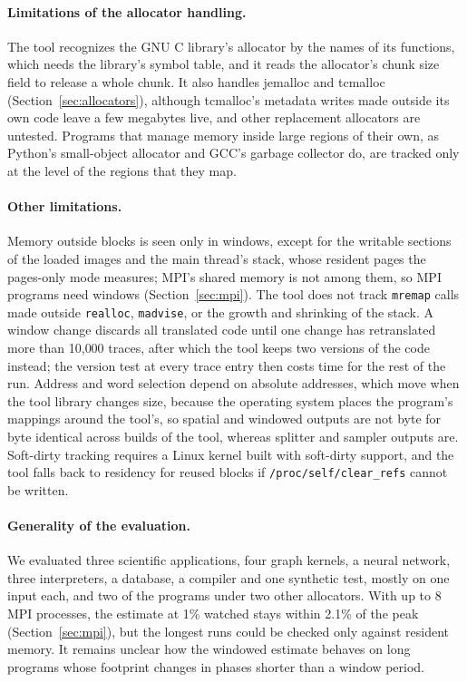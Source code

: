 \documentclass[11pt]{article}
\newcommand{\secref}[1]{Section~\ref{#1}}
\begin{document}
\paragraph{Limitations of the allocator handling.}
The tool recognizes the GNU C library's allocator by the names of its functions, which needs the library's symbol table, and it reads the allocator's chunk size field to release a whole chunk. It also handles jemalloc and tcmalloc (\secref{sec:allocators}), although tcmalloc's metadata writes made outside its own code leave a few megabytes live, and other replacement allocators are untested. Programs that manage memory inside large regions of their own, as Python's small-object allocator and GCC's garbage collector do, are tracked only at the level of the regions that they map.

\paragraph{Other limitations.}
Memory outside blocks is seen only in windows, except for the writable sections of the loaded images and the main thread's stack, whose resident pages the pages-only mode measures; MPI's shared memory is not among them, so MPI programs need windows (\secref{sec:mpi}). The tool does not track \texttt{mremap} calls made outside \texttt{realloc}, \texttt{madvise}, or the growth and shrinking of the stack. A window change discards all translated code until one change has retranslated more than 10{,}000 traces, after which the tool keeps two versions of the code instead; the version test at every trace entry then costs time for the rest of the run. Address and word selection depend on absolute addresses, which move when the tool library changes size, because the operating system places the program's mappings around the tool's, so spatial and windowed outputs are not byte for byte identical across builds of the tool, whereas splitter and sampler outputs are. Soft-dirty tracking requires a Linux kernel built with soft-dirty support, and the tool falls back to residency for reused blocks if \texttt{/proc/self/clear\_refs} cannot be written.

\paragraph{Generality of the evaluation.}
We evaluated three scientific applications, four graph kernels, a neural network, three interpreters, a database, a compiler and one synthetic test, mostly on one input each, and two of the programs under two other allocators. With up to 8 MPI processes, the estimate at 1\% watched stays within 2.1\% of the peak (\secref{sec:mpi}), but the longest runs could be checked only against resident memory. It remains unclear how the windowed estimate behaves on long programs whose footprint changes in phases shorter than a window period.
\end{document}
